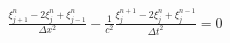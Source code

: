 \documentclass[preview]{standalone}
\begin{document}
\begin{align*}
\frac{\xi_{j+1}^{n} - 2 \xi_{j}^{n} + \xi_{j-1}^{n}}{\Delta x^2} - \frac{1}{c^2}\frac{\xi_{j}^{n+1} - 2 \xi_{j}^{n} + \xi_{j}^{n-1}}{\Delta t^2}  = 0
\end{align*}
\end{document}
